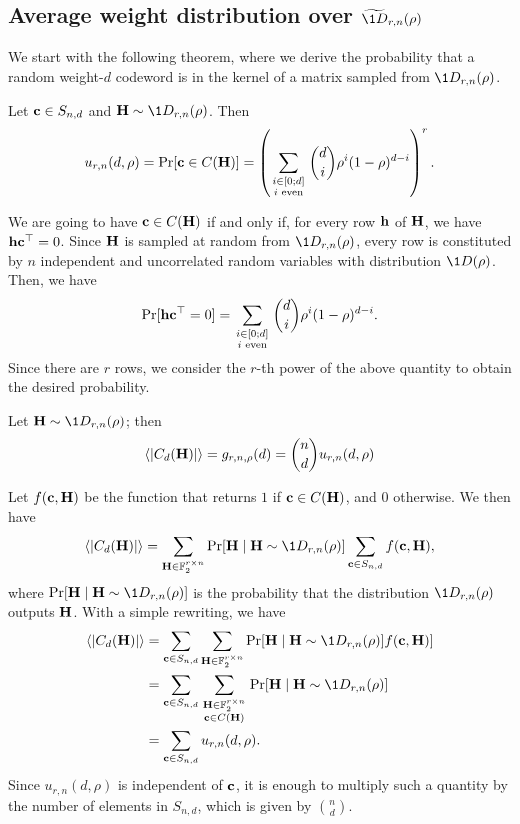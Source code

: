 \subsection{Average weight distribution over $\widetilde{\1{D}}_{r,n}(\rho)$}

We start with the following theorem, where we derive the probability that a random weight-$d$ codeword is in the kernel of a matrix sampled from $\1{D}_{r,n}(\rho)$.
\begin{theorem}\label{the:pr_c_H}
Let $\mathbf c\in S_{n,d}$ and $\6H\sim\1{D}_{r,n}(\rho)$.
Then
$$u_{r,n}(d,\rho) = \mathrm{Pr}[\mathbf c\in C(\mathbf H)] = \left(\sum_{\begin{smallmatrix}
i \in [0 ; d]\\
\text{$i$ even}\end{smallmatrix}}\binom{d}{i}\rho^i(1-\rho)^{d-i}\right)^r.$$
\end{theorem}
\begin{IEEEproof}
We are going to have $\mathbf c\in C(\mathbf H)$ if and only if, for every row $\mathbf h$ of $\mathbf H$, we have $\mathbf h \mathbf c^\top = 0$.
Since $\mathbf H$ is sampled at random from $\1{D}_{r,n}(\rho)$, every row is constituted by $n$ independent and uncorrelated random variables with distribution $\1{D}(\rho)$.
Then, we have
$$\mathrm{Pr}[ \mathbf h \mathbf c^\top = 0] = \sum_{\begin{smallmatrix}
i \in [0 ; d]\\
\text{$i$ even}\end{smallmatrix}}\binom{d}{i}\rho^i(1-\rho)^{d-i}.$$
Since there are $r$ rows, we consider the $r$-th power of the above quantity to obtain the desired probability.
\end{IEEEproof}
\begin{theorem}\label{the:average_weight_H}
Let $\6H\sim\1{D}_{r,n}(\rho)$; then
$$\langle |C_d(\mathbf H)|\rangle = g_{r,n,\rho}(d) =  \binom{n}{d}u_{r,n}(d,\rho)$$
\end{theorem}
\begin{IEEEproof}
Let $f(\mathbf c,\mathbf H)$ be the function that returns $1$ if $\mathbf c\in C(\mathbf H)$, and $0$ otherwise.
We then have
$$\langle |C_d(\6H)|\rangle = \sum_{\6H\in \mathbb F_2^{r\times n}}\mathrm{Pr}[\6H\mid \6H\sim\1{D}_{r,n}(\rho)]\sum_{\6c\in S_{n,d}} f(\6c,\6H),$$
where $\mathrm{Pr}[\6H\mid \6H\sim\1{D}_{r,n}(\rho)]$ is the probability that the distribution $\1{D}_{r,n}(\rho)$ outputs $\mathbf H$. 
With a simple rewriting, we have
\begin{align*}
\langle |C_d(\6H)|\rangle &\nonumber = \sum_{\6c\in S_{n,d}}\sum_{\6H\in \mathbb F_2^{r\times n}}\mathrm{Pr}[\6H\mid \6H\sim\1{D}_{r,n}(\rho)] f(\6c,\6H)]\\\nonumber
& = \sum_{\6c\in S_{n,d}}\sum_{\begin{smallmatrix}\6H\in\mathbb F_2^{r\times n}\\
\6c\in C(\6H)\end{smallmatrix}}\mathrm{Pr}[\6H\mid \6H\sim\1{D}_{r,n}(\rho)]\\\nonumber
& = \sum_{\6c\in S_{n,d}}u_{r,n}(d,\rho).
\end{align*}
Since $u_{r,n}(d,\rho)$ is independent of $\mathbf c$, it is enough to multiply such a quantity by the number of elements in $S_{n,d}$, which is given by $\binom{n}{d}$.
\end{IEEEproof}
